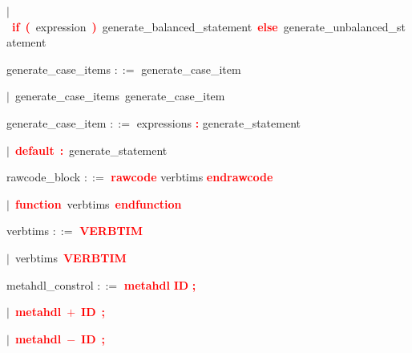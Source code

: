 \mbox{$|$ \textbf{\textcolor{red}{if}} \textbf{\textcolor{red}{(}} expression \textbf{\textcolor{red}{)}} generate\_balanced\_statement \textbf{\textcolor{red}{else}} generate\_unbalanced\_statement}

\vspace{1em}
\noindent
\settowidth{\parindent}{\hspace{4ex}}
generate\_case\_items $::=$\hspace{1ex} generate\_case\_item

\mbox{$|$ generate\_case\_items generate\_case\_item}

\vspace{1em}
\noindent
\settowidth{\parindent}{\hspace{4ex}}
generate\_case\_item $::=$\hspace{1ex} expressions \textbf{\textcolor{red}{:}} generate\_statement

\mbox{$|$ \textbf{\textcolor{red}{default}} \textbf{\textcolor{red}{:}} generate\_statement}

\vspace{1em}
\noindent
\settowidth{\parindent}{\hspace{4ex}}
rawcode\_block $::=$\hspace{1ex} \textbf{\textcolor{red}{rawcode}} verbtims \textbf{\textcolor{red}{endrawcode}}

\mbox{$|$ \textbf{\textcolor{red}{function}} verbtims \textbf{\textcolor{red}{endfunction}}}

\vspace{1em}
\noindent
\settowidth{\parindent}{\hspace{4ex}}
verbtims $::=$\hspace{1ex} \textbf{\textcolor{red}{VERBTIM}}

\mbox{$|$ verbtims \textbf{\textcolor{red}{VERBTIM}}}

\vspace{1em}
\noindent
\settowidth{\parindent}{\hspace{4ex}}
metahdl\_constrol $::=$\hspace{1ex} \textbf{\textcolor{red}{metahdl}} \textbf{\textcolor{red}{ID}} \textbf{\textcolor{red}{;}}

\mbox{$|$ \textbf{\textcolor{red}{metahdl}} \textbf{\textcolor{red}{$+$}} \textbf{\textcolor{red}{ID}} \textbf{\textcolor{red}{;}}}

\mbox{$|$ \textbf{\textcolor{red}{metahdl}} \textbf{\textcolor{red}{$-$}} \textbf{\textcolor{red}{ID}} \textbf{\textcolor{red}{;}}}

